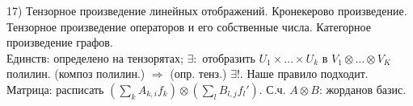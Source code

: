 17) Тензорное произведение линейных отображений. Кронекерово произведение. Тензорное произведение операторов и его собственные числа. Категорное произведение графов.\\
Единств: определено на тензорятах; $\exists:$ отобразить $U_1\times\dots\times U_k$ в $V_1\otimes\dots\otimes V_K$ полилин. (композ полилин.) $\Rightarrow$ (опр. тенз.) $\exists!$. Наше правило подходит. Матрица: расписать $(\sum\limits_{k} A_{k, i} f_k)\otimes(\sum\limits_{l} B_{l, j} f_l')$. С.ч. $A\otimes B$: жорданов базис.\\
